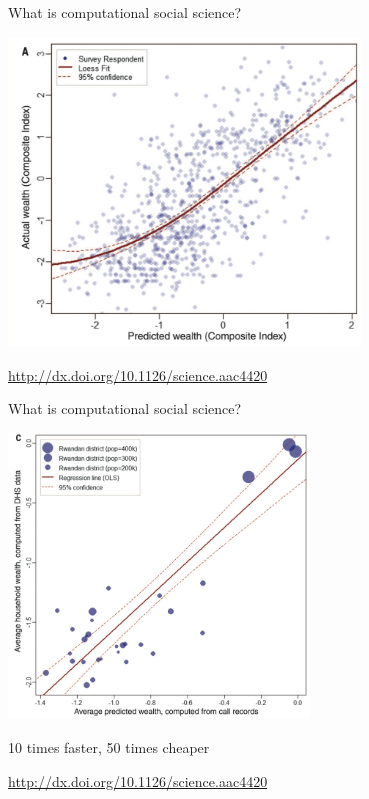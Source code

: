 \documentclass{beamer}
\def\vf{\vfill}
\begin{document}
\begin{frame}{What is computational social science?}

\begin{center}
\includegraphics[width=0.7\textwidth]{figures/blumenstock_predicting_2015_fig1a}
\end{center}

\vf
\tiny{\textcolor{blue}{\url{http://dx.doi.org/10.1126/science.aac4420}}}

\end{frame}
\begin{frame}{What is computational social science?}

\begin{center}
\includegraphics[width=0.60\textwidth]{figures/blumenstock_predicting_2015_fig3c}
\end{center}


\begin{center}
	10 times faster, 50 times cheaper
\end{center}

\vf
\tiny{\textcolor{blue}{\url{http://dx.doi.org/10.1126/science.aac4420}}}
\end{frame}
\end{document}
